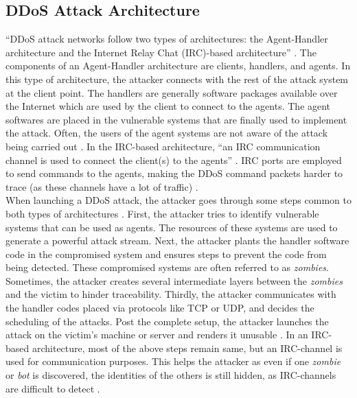 \subsection{DDoS Attack Architecture}
``DDoS attack networks follow two types of architectures: the Agent-Handler architecture and the Internet Relay Chat (IRC)-based architecture'' \cite{monowar01}. The components of an Agent-Handler architecture are clients, handlers, and agents. In this type of architecture, the attacker connects with the rest of the attack system at the client point. The handlers are generally software packages available over the Internet which are used by the client to connect to the agents. The agent softwares are placed in the vulnerable systems that are finally used to implement the attack. Often, the users of the agent systems are not aware of the attack being carried out \cite{monowar01}. In the IRC-based architecture, ``an IRC communication channel is used to connect the client(s) to the agents'' \cite{monowar01}. IRC ports are employed to send commands to the agents, making the DDoS command packets harder to trace (as these channels have a lot of traffic) \cite{monowar01}.\\
When launching a DDoS attack, the attacker goes through some steps common to both types of architectures \cite{monowar01}. First, the attacker tries to identify vulnerable systems that can be used as agents. The resources of these systems are used to generate a powerful attack stream. Next, the attacker plants the handler software code in the compromised system and ensures steps to prevent the code from being detected. These compromised systems are often referred to as {\em zombies}. Sometimes, the attacker creates several intermediate layers between the {\em zombies} and the victim to hinder traceability. Thirdly, the attacker communicates with the handler codes placed via protocols like TCP or UDP, and decides the scheduling of the attacks. Post the complete setup, the attacker launches the attack on the victim's machine or server and renders it unusable \cite{monowar01}. In an IRC-based architecture, most of the above steps remain same, but an IRC-channel is used for communication purposes. This helps the attacker as even if one {\em zombie} or {\em bot} is discovered, the identities of the others is still hidden, as IRC-channels are difficult to detect \cite{monowar01}.
